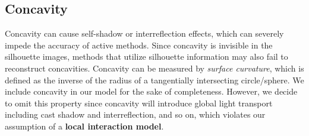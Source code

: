 


\subsection{Concavity}
Concavity can cause self-shadow or interreflection effects, which can severely impede the accuracy of active methods. Since concavity is invisible in the silhouette images, methods that utilize silhouette information may also fail to reconstruct concavities. Concavity can be measured by \textit{surface curvature}, which is defined as the inverse of the radius of a tangentially intersecting circle/sphere. We include concavity in our model for the sake of completeness. However, we decide to omit this property since concavity will introduce global light transport including cast shadow and interreflection, and so on, which violates our assumption of a \textbf{local interaction model}.


